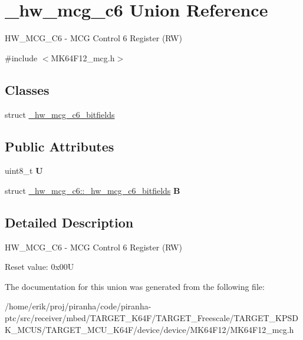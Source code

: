 \hypertarget{union__hw__mcg__c6}{}\section{\+\_\+hw\+\_\+mcg\+\_\+c6 Union Reference}
\label{union__hw__mcg__c6}


H\+W\+\_\+\+M\+C\+G\+\_\+\+C6 -\/ M\+CG Control 6 Register (RW)  




{\ttfamily \#include $<$M\+K64\+F12\+\_\+mcg.\+h$>$}

\subsection*{Classes}
\begin{DoxyCompactItemize}
\item 
struct \hyperlink{struct__hw__mcg__c6_1_1__hw__mcg__c6__bitfields}{\+\_\+hw\+\_\+mcg\+\_\+c6\+\_\+bitfields}
\end{DoxyCompactItemize}
\subsection*{Public Attributes}
\begin{DoxyCompactItemize}
\item 
uint8\+\_\+t {\bfseries U}\hypertarget{union__hw__mcg__c6_a05cd228f956d70b7ed0914a5cd5b59c9}{}\label{union__hw__mcg__c6_a05cd228f956d70b7ed0914a5cd5b59c9}

\item 
struct \hyperlink{struct__hw__mcg__c6_1_1__hw__mcg__c6__bitfields}{\+\_\+hw\+\_\+mcg\+\_\+c6\+::\+\_\+hw\+\_\+mcg\+\_\+c6\+\_\+bitfields} {\bfseries B}\hypertarget{union__hw__mcg__c6_aac89069f1ca74305a44a7697f5ffb9cb}{}\label{union__hw__mcg__c6_aac89069f1ca74305a44a7697f5ffb9cb}

\end{DoxyCompactItemize}


\subsection{Detailed Description}
H\+W\+\_\+\+M\+C\+G\+\_\+\+C6 -\/ M\+CG Control 6 Register (RW) 

Reset value\+: 0x00U 

The documentation for this union was generated from the following file\+:\begin{DoxyCompactItemize}
\item 
/home/erik/proj/piranha/code/piranha-\/ptc/src/receiver/mbed/\+T\+A\+R\+G\+E\+T\+\_\+\+K64\+F/\+T\+A\+R\+G\+E\+T\+\_\+\+Freescale/\+T\+A\+R\+G\+E\+T\+\_\+\+K\+P\+S\+D\+K\+\_\+\+M\+C\+U\+S/\+T\+A\+R\+G\+E\+T\+\_\+\+M\+C\+U\+\_\+\+K64\+F/device/device/\+M\+K64\+F12/M\+K64\+F12\+\_\+mcg.\+h\end{DoxyCompactItemize}
